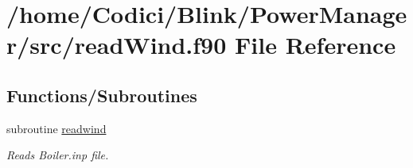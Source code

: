 \hypertarget{read_wind_8f90}{\section{/home/\-Codici/\-Blink/\-Power\-Manager/src/read\-Wind.f90 File Reference}
\label{read_wind_8f90}
}
\subsection*{Functions/\-Subroutines}
\begin{DoxyCompactItemize}
\item 
subroutine \hyperlink{read_wind_8f90_a56b52d565348f1a4a11f1b82dcc9efb9}{readwind}
\begin{DoxyCompactList}\small\item\em Reads Boiler.\-inp file. \end{DoxyCompactList}\end{DoxyCompactItemize}


